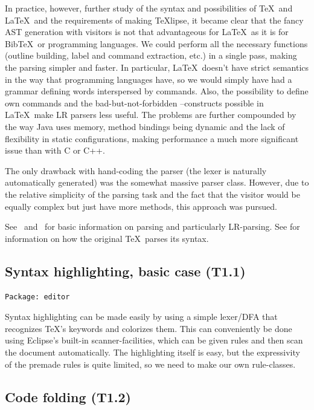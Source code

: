 \documentclass[a4paper,11pt,twoside]{article}
\newcommand{\texlipse}{\TeX lipse}
\begin{document}
In practice, however, further study of the syntax and possibilities of
\TeX\ and \LaTeX\ and the requirements of making \texlipse, it became
clear that the fancy AST generation with visitors is not that advantageous
for \LaTeX\ as it is for Bib\TeX\ or programming languages. We could perform
all the necessary functions (outline building, label and command extraction,
etc.) in a single pass, making the parsing simpler and faster. In particular,
\LaTeX\ doesn't have strict semantics in the way that programming languages 
have, so we would simply have had a grammar defining words interspersed by 
commands. Also, the possibility to define own commands and the 
bad-but-not-forbidden --constructs possible in \LaTeX\ make LR parsers less
useful. The problems are further compounded by the way Java uses memory, method
bindings being dynamic and the lack of flexibility in static configurations,
making performance a much more significant issue than with C or C++.

The only drawback with hand-coding the parser (the lexer is naturally
automatically generated) was the somewhat massive parser class. However,
due to the relative simplicity of the parsing task and the fact that the
visitor would be equally complex but just have more methods, this
approach was pursued.


See~\cite{Aho:CPT86} and~\cite{Knuth:j-IC-8-6-607} for basic information on 
parsing and particularly LR-parsing. See \cite{Knuth:texprogram86} for 
information on how the original \TeX\ parses its syntax.


\subsection{Syntax highlighting, basic case (T1.1)}
\label{sect:t1.1}

\texttt{Package: editor}

Syntax highlighting can be made easily by using a simple lexer/DFA that 
recognizes \TeX 's keywords and colorizes them. This can conveniently be done 
using Eclipse's built-in scanner-facilities, which can be given rules and then 
scan the document automatically. The highlighting itself is easy, but the 
expressivity of the premade rules is quite limited, so we need to make our own 
rule-classes.


\subsection{Code folding (T1.2)}
\end{document}
